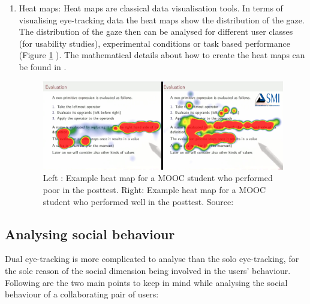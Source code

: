 \documentclass{sig-alternate}
\begin{document}
\begin{enumerate}
\item Heat maps: Heat maps are classical data visualisation tools. In terms of visualising eye-tracking data the heat maps show the distribution of the gaze. The distribution of the gaze then can be analysed for different user classes (for usability studies), experimental conditions or task based performance (Figure \ref{heatMap}  \cite{sharma2014how}). The mathematical details about how to create the heat maps can be found in \cite{duchowski2007eye}. 

\begin{figure}
    \centering
    \includegraphics[width=\linewidth]{heat-map}
    \caption{Left : Example heat map for a MOOC student who performed poor in the posttest. Right: Example heat map for a MOOC student who performed well in the posttest. Source: \cite{sharma2014how}}
    \label{heatMap}
\end{figure}


\end {enumerate}


\subsection{Analysing social behaviour}

Dual eye-tracking is more complicated to analyse than the solo eye-tracking, for the sole reason of the social dimension being involved in the users' behaviour. Following are the two main points to keep in mind while analysing the social behaviour of a collaborating pair of users: 
\end{document}
